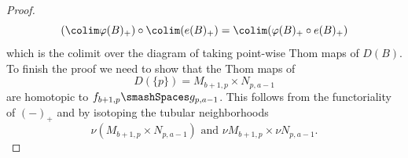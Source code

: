 \begin{proof}
\begin{equation*}
        (\colim \varphi(B)_+) \circ \colim(e(B)_+) = \colim(\varphi(B)_+ \circ  e(B)_+)
    \end{equation*}
    which is the colimit over the diagram of taking point-wise Thom maps of $D(B)$. To finish the proof we need to show that the Thom maps of 
    \begin{equation*}
        D(\{p\}) = M_{b+1,p} \times N_{p,a-1}
    \end{equation*}
    are homotopic to $f_{b+1,p}\smashSpaces g_{p,a-1}$.
    This follows from the functoriality of $(-)_+$ and by isotoping the tubular neighborhoods
    \begin{equation*}
        \nu (M_{b+1,p} \times N_{p,a-1})  \text{ and } \nu M_{b+1,p} \times \nu N_{p,a-1}.
    \end{equation*}
\end{proof}

